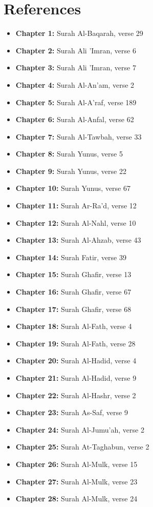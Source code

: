 \chapter{References}

\begin{itemize}
    \item \textbf{Chapter 1:} Surah Al-Baqarah, verse 29
    \item \textbf{Chapter 2:} Surah Ali 'Imran, verse 6
    \item \textbf{Chapter 3:} Surah Ali 'Imran, verse 7
    \item \textbf{Chapter 4:} Surah Al-An'am, verse 2
    \item \textbf{Chapter 5:} Surah Al-A'raf, verse 189
    \item \textbf{Chapter 6:} Surah Al-Anfal, verse 62
    \item \textbf{Chapter 7:} Surah Al-Tawbah, verse 33
    \item \textbf{Chapter 8:} Surah Yunus, verse 5
    \item \textbf{Chapter 9:} Surah Yunus, verse 22
    \item \textbf{Chapter 10:} Surah Yunus, verse 67
    \item \textbf{Chapter 11:} Surah Ar-Ra'd, verse 12
    \item \textbf{Chapter 12:} Surah Al-Nahl, verse 10
    \item \textbf{Chapter 13:} Surah Al-Ahzab, verse 43
    \item \textbf{Chapter 14:} Surah Fatir, verse 39
    \item \textbf{Chapter 15:} Surah Ghafir, verse 13
    \item \textbf{Chapter 16:} Surah Ghafir, verse 67
    \item \textbf{Chapter 17:} Surah Ghafir, verse 68
    \item \textbf{Chapter 18:} Surah Al-Fath, verse 4
    \item \textbf{Chapter 19:} Surah Al-Fath, verse 28
    \item \textbf{Chapter 20:} Surah Al-Hadid, verse 4
    \item \textbf{Chapter 21:} Surah Al-Hadid, verse 9
    \item \textbf{Chapter 22:} Surah Al-Hashr, verse 2
    \item \textbf{Chapter 23:} Surah As-Saf, verse 9
    \item \textbf{Chapter 24:} Surah Al-Jumu'ah, verse 2
    \item \textbf{Chapter 25:} Surah At-Taghabun, verse 2
    \item \textbf{Chapter 26:} Surah Al-Mulk, verse 15
    \item \textbf{Chapter 27:} Surah Al-Mulk, verse 23
    \item \textbf{Chapter 28:} Surah Al-Mulk, verse 24    
\end{itemize}